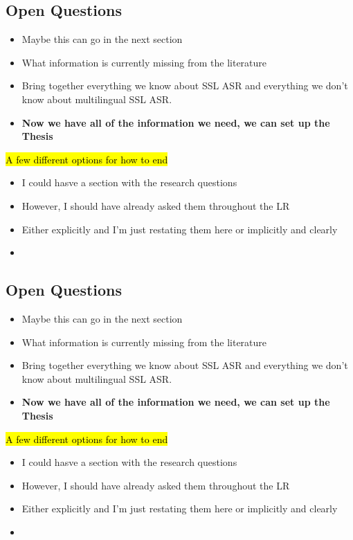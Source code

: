 \subsection{Open Questions}
\begin{itemize}
    \item Maybe this can go in the next section
    \item What information is currently missing from the literature
    \item Bring together everything we know about SSL ASR and everything we don't know about multilingual SSL ASR.
    \item \textbf{Now we have all of the information we need, we can set up the Thesis}
\end{itemize}

\hl{A few different options for how to end}
\begin{itemize}
    \item I could hasve a section with the research questions
    \item However, I should have already asked them throughout the LR
    \item Either explicitly and I'm just restating them here or implicitly and clearly
    \item 
\end{itemize}







\subsection{Open Questions}
\begin{itemize}
    \item Maybe this can go in the next section
    \item What information is currently missing from the literature
    \item Bring together everything we know about SSL ASR and everything we don't know about multilingual SSL ASR.
    \item \textbf{Now we have all of the information we need, we can set up the Thesis}
\end{itemize}

\hl{A few different options for how to end}
\begin{itemize}
    \item I could hasve a section with the research questions
    \item However, I should have already asked them throughout the LR
    \item Either explicitly and I'm just restating them here or implicitly and clearly
    \item 
\end{itemize}


